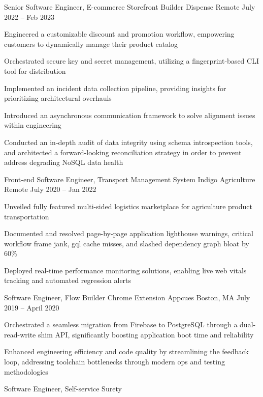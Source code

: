 \documentclass[]{awesome-cv}
\begin{document}
\begin{cventries}
	\cventry
	{Senior Software Engineer, E-commerce Storefront Builder}
	{Dispense}
	{Remote}
	{July 2022 – Feb 2023}
	{\begin{cvitems}
		\item {Engineered a customizable discount and promotion workflow, empowering customers to dynamically manage their product catalog}
		\item {Orchestrated secure key and secret management, utilizing a fingerprint-based CLI tool for distribution}
		\item {Implemented an incident data collection pipeline, providing insights for prioritizing architectural overhauls}
		\item {Introduced an asynchronous communication framework to solve alignment issues within engineering}
		\item {Conducted an in-depth audit of data integrity using schema introspection tools, and architected a forward-looking reconciliation strategy in order to prevent address degrading NoSQL data health}
		\end{cvitems}}
	\cventry
	{Front-end Software Engineer, Transport Management System}
	{Indigo Agriculture}
	{Remote}
	{July 2020 – Jan 2022}
	{\begin{cvitems}
		\item {Unveiled fully featured multi-sided logistics marketplace for agriculture product transportation}
		\item {Documented and resolved page-by-page application lighthouse warnings, critical workflow frame jank, gql cache misses, and slashed dependency graph bloat by 60\%}
		\item {Deployed real-time performance monitoring solutions, enabling live web vitals tracking and automated regression alerts}
		\end{cvitems}}
	\cventry
	{Software Engineer, Flow Builder Chrome Extension}
	{Appcues}
	{Boston, MA}
	{July 2019 – April 2020}
	{\begin{cvitems}
		\item {Orchestrated a seamless migration from Firebase to PostgreSQL through a dual-read-write shim API, significantly boosting application boot time and reliability}
		\item {Enhanced engineering efficiency and code quality by streamlining the feedback loop, addressing toolchain bottlenecks through modern ops and testing methodologies}
		\end{cvitems}}
	\cventry
	{Software Engineer, Self-service Surety}

\end{cventries}
\end{document}
